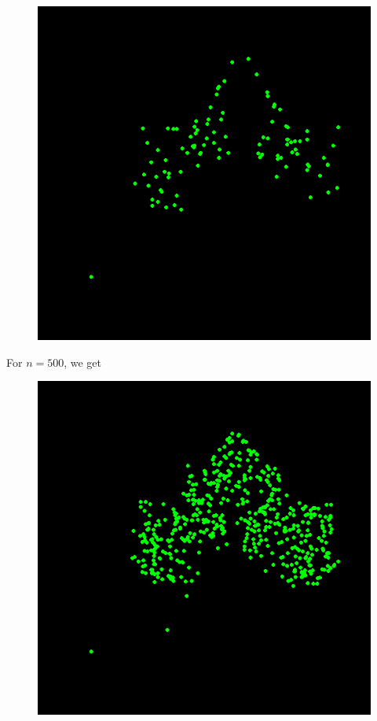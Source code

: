 \documentclass[11pt, a4paper]{article}
\begin{document}
\begin{figure}[!htbp]
\centering
\includegraphics[scale=0.3]{02}
\end{figure}


For $n = 500$, we get

\begin{figure}[h]
\centering
\includegraphics[scale=0.3]{03}
\end{figure}
\end{document}
